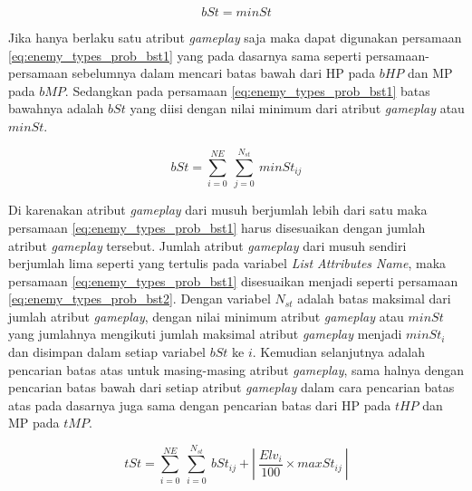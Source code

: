 \begin{equation}\label{eq:enemy_types_prob_bst1}
bSt = minSt
\end{equation}

Jika hanya berlaku satu atribut \textit{gameplay} saja maka dapat digunakan persamaan \ref{eq:enemy_types_prob_bst1} yang pada dasarnya sama seperti persamaan-persamaan sebelumnya dalam mencari batas bawah dari HP pada $bHP$ dan MP pada $bMP$. Sedangkan pada persamaan \ref{eq:enemy_types_prob_bst1} batas bawahnya adalah $bSt$ yang diisi dengan nilai minimum dari atribut \textit{gameplay} atau $minSt$.
\vspace{1ex}

\begin{equation}\label{eq:enemy_types_prob_bst2}
bSt = \sum_{i=0}^{NE}\ \sum_{j=0}^{N_{st}}\ minSt_{ij}
\end{equation}

Di karenakan atribut \textit{gameplay} dari musuh berjumlah lebih dari satu maka persamaan \ref{eq:enemy_types_prob_bst1} harus disesuaikan dengan jumlah atribut \textit{gameplay} tersebut. Jumlah atribut \textit{gameplay} dari musuh sendiri berjumlah lima seperti yang tertulis pada variabel \textit{List Attributes Name}, maka persamaan \ref{eq:enemy_types_prob_bst1} disesuaikan menjadi seperti persamaan \ref{eq:enemy_types_prob_bst2}. Dengan variabel $N_{st}$ adalah batas maksimal dari jumlah atribut \textit{gameplay}, dengan nilai minimum atribut \textit{gameplay} atau $minSt$ yang jumlahnya mengikuti jumlah maksimal atribut \textit{gameplay} menjadi $minSt_{i}$ dan disimpan dalam setiap variabel $bSt$ ke $i$. Kemudian selanjutnya adalah pencarian batas atas untuk masing-masing atribut \textit{gameplay}, sama halnya dengan pencarian batas bawah dari setiap atribut \textit{gameplay} dalam cara pencarian batas atas pada dasarnya juga sama dengan pencarian batas dari HP pada $tHP$ dan MP pada $tMP$.
\vspace{1ex}

\begin{equation}\label{eq:enemy_types_prob_tst}
tSt = \sum_{i=0}^{NE}\ \sum_{i=0}^{N_{st}}\ bSt_{ij} + \left |\ \frac{Elv_{i}}{100} \times maxSt_{ij}\ \right |
\end{equation}

